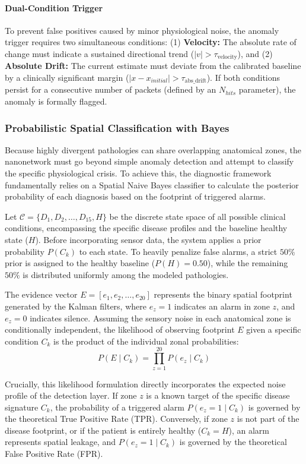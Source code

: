 \documentclass[sigconf]{acmart}
\begin{document}
\paragraph{Dual-Condition Trigger} To prevent false positives caused by minor physiological noise, the anomaly trigger requires two simultaneous conditions: (1) \textbf{Velocity:} The absolute rate of change must indicate a sustained directional trend ($|v| > \tau_{\text{velocity}}$), and (2) \textbf{Absolute Drift:} The current estimate must deviate from the calibrated baseline by a clinically significant margin ($|x - x_{initial}| > \tau_{\text{abs\_drift}}$). If both conditions persist for a consecutive number of packets (defined by an $N_{hits}$ parameter), the anomaly is formally flagged.

\subsubsection{Probabilistic Spatial Classification with Bayes}
Because highly divergent pathologies can share overlapping anatomical zones, the nanonetwork must go beyond simple anomaly detection and attempt to classify the specific physiological crisis. To achieve this, the diagnostic framework fundamentally relies on a Spatial Naive Bayes classifier to calculate the posterior probability of each diagnosis based on the footprint of triggered alarms.

Let $\mathcal{C} = \{D_1, D_2, \dots, D_{15}, H\}$ be the discrete state space of all possible clinical conditions, encompassing the specific disease profiles and the baseline healthy state ($H$). Before incorporating sensor data, the system applies a prior probability $P(C_k)$ to each state. To heavily penalize false alarms, a strict $50\%$ prior is assigned to the healthy baseline ($P(H) = 0.50$), while the remaining $50\%$ is distributed uniformly among the modeled pathologies.

The evidence vector $E = [e_1, e_2, \dots, e_{20}]$ represents the binary spatial footprint generated by the Kalman filters, where $e_z = 1$ indicates an alarm in zone $z$, and $e_z = 0$ indicates silence. Assuming the sensory noise in each anatomical zone is conditionally independent, the likelihood of observing footprint $E$ given a specific condition $C_k$ is the product of the individual zonal probabilities:
$$P(E \mid C_k)=\prod_{z=1}^{20}P(e_z \mid C_k)$$

Crucially, this likelihood formulation directly incorporates the expected noise profile of the detection layer. If zone $z$ is a known target of the specific disease signature $C_k$, the probability of a triggered alarm $P(e_z=1 \mid C_k)$ is governed by the theoretical True Positive Rate (TPR). Conversely, if zone $z$ is not part of the disease footprint, or if the patient is entirely healthy ($C_k=H$), an alarm represents spatial leakage, and $P(e_z=1 \mid C_k)$ is governed by the theoretical False Positive Rate (FPR). 
\end{document}

